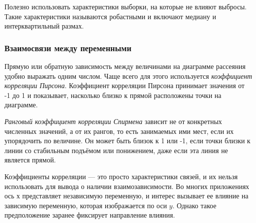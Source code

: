 \documentclass[11pt,a4paper]{article}
\begin{document}
Полезно использовать характеристики выборки, на которые не влияют
выбросы. Такие характеристики называются робастными и включают медиану и
интерквартильный размах.

    \hypertarget{ux432ux437ux430ux438ux43cux43eux441ux432ux44fux437ux438-ux43cux435ux436ux434ux443-ux43fux435ux440ux435ux43cux435ux43dux43dux44bux43cux438}{%
\subsubsection{Взаимосвязи между
переменными}\label{ux432ux437ux430ux438ux43cux43eux441ux432ux44fux437ux438-ux43cux435ux436ux434ux443-ux43fux435ux440ux435ux43cux435ux43dux43dux44bux43cux438}}

Прямую или обратную зависимость между величинами на диаграмме рассеяния
удобно выражать одним числом. Чаще всего для этого используется
\emph{коэффициент корреляции Пирсона}. Коэффициент корреляции Пирсона
принимает значения от -1 до 1 и показывает, насколько близко к прямой
расположены точки на диаграмме.

\emph{Ранговый коэффициент корреляции Спирмена} зависит не от конкретных
численных значений, а от их рангов, то есть занимаемых ими мест, если их
упорядочить по величине. Он может быть близок к 1 или -1, если точки
близки к линии со стабильным подъёмом или понижением, даже если эта
линия не является прямой.

Коэффициенты корреляции --- это просто характеристики связей, и их
нельзя использовать для вывода о наличии взаимозависимости. Во многих
приложениях ось \(х\) представляет независимую переменную, и интерес
вызывает ее влияние на зависимую переменную, которая изображается по оси
\(y\). Однако такое предположение заранее фиксирует направление влияния.
\end{document}
